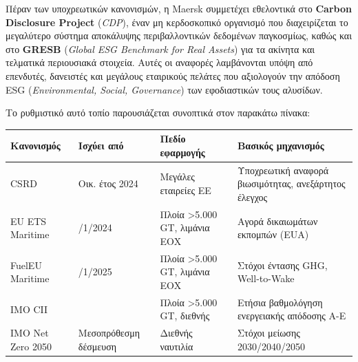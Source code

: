 \documentclass[11pt,a4paper,greek,twoside]{template-xe}
\begin{document}
Πέραν των υποχρεωτικών κανονισμών, η Maersk συμμετέχει εθελοντικά στο
\textbf{Carbon Disclosure Project} (\emph{CDP}), έναν μη κερδοσκοπικό
οργανισμό που διαχειρίζεται το μεγαλύτερο σύστημα αποκάλυψης
περιβαλλοντικών δεδομένων παγκοσμίως, καθώς και στο \textbf{GRESB}
(\emph{Global ESG Benchmark for Real Assets}) για τα ακίνητα και
τελματικά περιουσιακά στοιχεία. Αυτές οι αναφορές λαμβάνονται υπόψη από
επενδυτές, δανειστές και μεγάλους εταιρικούς πελάτες που αξιολογούν την
απόδοση ESG (\emph{Environmental, Social, Governance}) των εφοδιαστικών
τους αλυσίδων.

Το ρυθμιστικό αυτό τοπίο παρουσιάζεται συνοπτικά στον παρακάτω πίνακα:

\begin{longtable}[]{@{}
  >{\raggedright\arraybackslash}p{}
  >{\raggedright\arraybackslash}p{}
  >{\raggedright\arraybackslash}p{}
  >{\raggedright\arraybackslash}p{}@{}}
\toprule\noalign{}
\begin{minipage}[b]{\linewidth}\raggedright
Κανονισμός
\end{minipage} & \begin{minipage}[b]{\linewidth}\raggedright
Ισχύει από
\end{minipage} & \begin{minipage}[b]{\linewidth}\raggedright
Πεδίο εφαρμογής
\end{minipage} & \begin{minipage}[b]{\linewidth}\raggedright
Βασικός μηχανισμός
\end{minipage} \\
\midrule\noalign{}
\endhead
\bottomrule\noalign{}
\endlastfoot
CSRD & Οικ. έτος 2024 & Μεγάλες εταιρείες ΕΕ & Υποχρεωτική αναφορά
βιωσιμότητας, ανεξάρτητος έλεγχος \\
EU ETS Maritime & 1/1/2024 & Πλοία \textgreater5.000 GT, λιμάνια ΕΟΧ &
Αγορά δικαιωμάτων εκπομπών (EUA) \\
FuelEU Maritime & 1/1/2025 & Πλοία \textgreater5.000 GT, λιμάνια ΕΟΧ &
Στόχοι έντασης GHG, Well-to-Wake \\
IMO CII & 2023 & Πλοία \textgreater5.000 GT, διεθνής & Ετήσια
βαθμολόγηση ενεργειακής απόδοσης A-E \\
IMO Net Zero 2050 & Μεσοπρόθεσμη δέσμευση & Διεθνής ναυτιλία & Στόχοι
μείωσης 2030/2040/2050 \\
\end{longtable}
\end{document}
